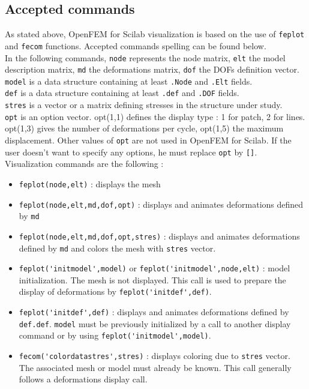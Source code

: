 \subsection{Accepted commands}
As stated above, OpenFEM for Scilab visualization is based on the use of \verb+feplot+ and \verb+fecom+ functions. Accepted commands spelling can be found below.\\ 
In the following commands, \verb+node+ represents the node matrix, \verb+elt+ the model description matrix, \verb+md+ the deformations matrix, \verb+dof+ the DOFs definition vector.\\
\verb+model+ is a data structure containing at least \verb+.Node+ and \verb+.Elt+ fields.\\
\verb+def+ is a data structure containing at least \verb+.def+ and \verb+.DOF+ fields.\\
\verb+stres+ is a vector or a matrix defining stresses in the structure under study.\\
\verb+opt+ is an option vector. opt(1,1) defines the display type : 1 for patch, 2 for lines. opt(1,3) gives the number of deformations per cycle, opt(1,5) the maximum displacement. Other values of \verb+opt+ are not used in OpenFEM for Scilab. If the user doesn't want to specify any options, he must replace \verb+opt+ by \verb+[]+.\\
Visualization commands are the following :
\vspace{0.1cm}
\begin{itemize}
\item \verb+feplot(node,elt)+ : displays the mesh 
\vspace{0.1cm}
\item \verb+feplot(node,elt,md,dof,opt)+ : displays and animates deformations defined by \verb+md+
\vspace{0.1cm}
\item \verb+feplot(node,elt,md,dof,opt,stres)+ : displays and animates deformations defined by \verb+md+ and colors the mesh with \verb+stres+ vector.
\vspace{0.1cm}
\item \verb+feplot('initmodel',model)+ or \verb+feplot('initmodel',node,elt)+ : model initialization. The mesh is not displayed. This call is used to prepare the display of deformations by \verb+feplot('initdef',def)+.
\vspace{0.1cm}
\item \verb+feplot('initdef',def)+ : displays and animates deformations defined by \verb+def.def+. \verb+model+ must be previously initialized by a call to another display command or by using \verb+feplot('initmodel',model)+.
\vspace{0.1cm}
\item \verb+fecom('colordatastres',stres)+ : displays coloring due to \verb+stres+ vector. The associated mesh or model must already be known. This call generally follows a deformations display call.
\end{itemize}
